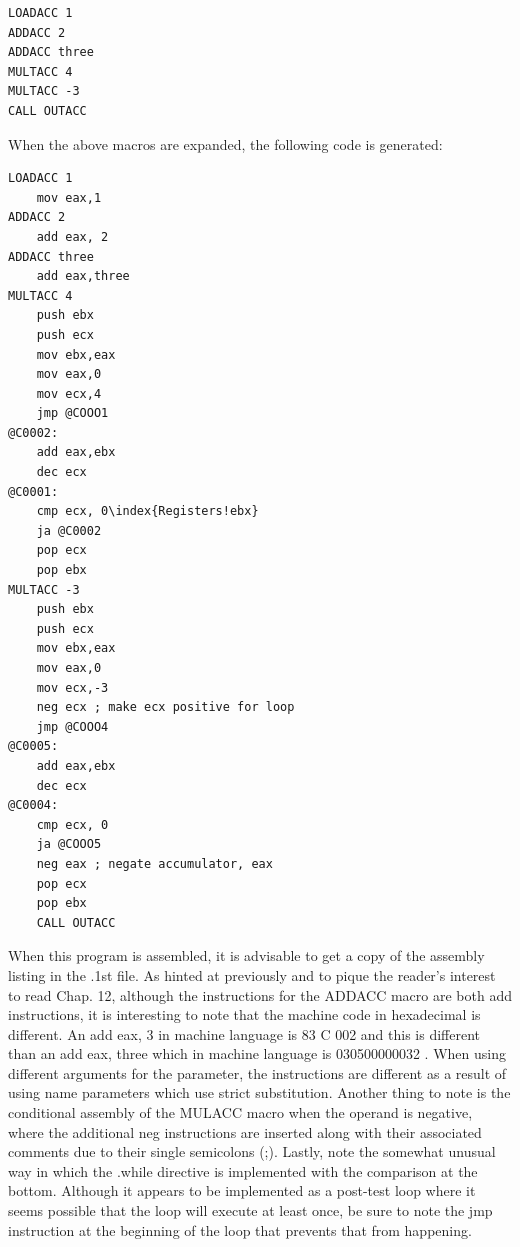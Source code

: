 \documentclass[10pt]{book}
\begin{document}
\begin{verbatim}
LOADACC 1
ADDACC 2
ADDACC three
MULTACC 4
MULTACC -3
CALL OUTACC
\end{verbatim}

When the above macros are expanded, the following code is generated:

\begin{verbatim}
LOADACC 1
    mov eax,1
ADDACC 2
    add eax, 2
ADDACC three
    add eax,three
MULTACC 4
    push ebx
    push ecx
    mov ebx,eax
    mov eax,0
    mov ecx,4
    jmp @COOO1
@C0002:
    add eax,ebx
    dec ecx
@C0001:
    cmp ecx, 0\index{Registers!ebx}
    ja @C0002
    pop ecx
    pop ebx
MULTACC -3
    push ebx
    push ecx
    mov ebx,eax
    mov eax,0
    mov ecx,-3
    neg ecx ; make ecx positive for loop
    jmp @COOO4
@C0005:
    add eax,ebx
    dec ecx
@C0004:
    cmp ecx, 0
    ja @COOO5
    neg eax ; negate accumulator, eax
    pop ecx
    pop ebx
    CALL OUTACC
\end{verbatim}

When this program is assembled, it is advisable to get a copy of the assembly listing in the .1st file. As hinted at previously and to pique the reader's interest to read Chap. 12, although the instructions for the ADDACC macro are both add instructions, it is interesting to note that the machine code in hexadecimal is different. An add eax, 3 in machine language is 83 C 002 and this is different than an add eax, three which in machine language is 030500000032 . When using different arguments for the parameter, the instructions are different as a result of using name parameters which use strict substitution. Another thing to note is the conditional assembly of the MULACC macro when the operand is negative, where the additional neg instructions are inserted along with their associated comments due to their single semicolons (;). Lastly, note the somewhat unusual way in which the .while directive is implemented with the comparison at the bottom. Although it appears to be implemented as a post-test loop where it seems possible that the loop will execute at least once, be sure to note the jmp instruction at the beginning of the loop that prevents that from happening.
\end{document}
